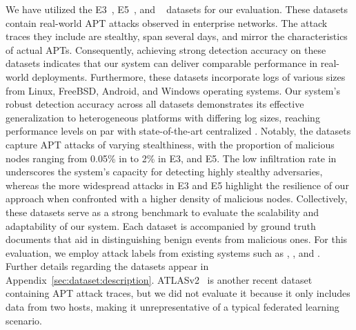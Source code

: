  We have utilized the \darpa E3~\cite{error3}, E5~\cite{bug5}, and \optc~\cite{darpaoptc} datasets for our evaluation. These datasets contain real-world APT attacks observed in enterprise networks. The attack traces they include are stealthy, span several days, and mirror the characteristics of actual APTs. Consequently, achieving strong detection accuracy on these datasets indicates that our system can deliver comparable performance in real-world deployments. Furthermore, these datasets incorporate logs of various sizes from Linux, FreeBSD, Android, and Windows operating systems. Our system’s robust detection accuracy across all datasets demonstrates its effective generalization to heterogeneous platforms with differing log sizes, reaching performance levels on par with state-of-the-art centralized \pids. Notably, the datasets capture APT attacks of varying stealthiness, with the proportion of malicious nodes ranging from 0.05\% in \optc to 2\% in E3, and E5. The low infiltration rate in \optc underscores the system’s capacity for detecting highly stealthy adversaries, whereas the more widespread attacks in E3 and E5 highlight the resilience of our approach when confronted with a higher density of malicious nodes. Collectively, these datasets serve as a strong benchmark to evaluate the scalability and adaptability of our system. Each \darpa dataset is accompanied by ground truth documents that aid in distinguishing benign events from malicious ones. For this evaluation, we employ attack labels from existing systems such as \threatrace, \kairos, and \flash. Further details regarding the datasets appear in Appendix~\ref{sec:dataset:description}. ATLASv2~\cite{riddle2023atlasv2} is another recent dataset containing APT attack traces, but we did not evaluate it because it only includes data from two hosts, making it unrepresentative of a typical federated learning scenario.



